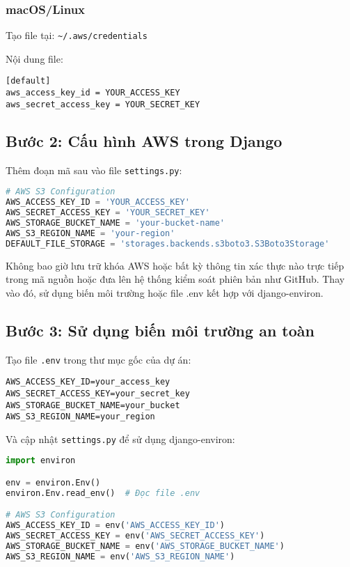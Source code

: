 \documentclass[12pt,a4paper]{article}
\begin{document}
\subsubsection{macOS/Linux}
Tạo file tại: \texttt{\~{}/.aws/credentials}

Nội dung file:

\begin{lstlisting}
[default]
aws_access_key_id = YOUR_ACCESS_KEY
aws_secret_access_key = YOUR_SECRET_KEY
\end{lstlisting}

\subsection{Bước 2: Cấu hình AWS trong Django}

Thêm đoạn mã sau vào file \texttt{settings.py}:

\begin{lstlisting}[language=python]
# AWS S3 Configuration
AWS_ACCESS_KEY_ID = 'YOUR_ACCESS_KEY'
AWS_SECRET_ACCESS_KEY = 'YOUR_SECRET_KEY'
AWS_STORAGE_BUCKET_NAME = 'your-bucket-name'
AWS_S3_REGION_NAME = 'your-region'
DEFAULT_FILE_STORAGE = 'storages.backends.s3boto3.S3Boto3Storage'
\end{lstlisting}

\begin{tcolorbox}[colback=red!5, colframe=red!50!black, title=Cảnh báo bảo mật]
Không bao giờ lưu trữ khóa AWS hoặc bất kỳ thông tin xác thực nào trực tiếp trong mã nguồn hoặc đưa lên hệ thống kiểm soát phiên bản như GitHub. Thay vào đó, sử dụng biến môi trường hoặc file .env kết hợp với django-environ.
\end{tcolorbox}

\subsection{Bước 3: Sử dụng biến môi trường an toàn}

Tạo file \texttt{.env} trong thư mục gốc của dự án:

\begin{lstlisting}
AWS_ACCESS_KEY_ID=your_access_key
AWS_SECRET_ACCESS_KEY=your_secret_key
AWS_STORAGE_BUCKET_NAME=your_bucket
AWS_S3_REGION_NAME=your_region
\end{lstlisting}

Và cập nhật \texttt{settings.py} để sử dụng django-environ:

\begin{lstlisting}[language=python]
import environ

env = environ.Env()
environ.Env.read_env()  # Đọc file .env

# AWS S3 Configuration
AWS_ACCESS_KEY_ID = env('AWS_ACCESS_KEY_ID')
AWS_SECRET_ACCESS_KEY = env('AWS_SECRET_ACCESS_KEY')
AWS_STORAGE_BUCKET_NAME = env('AWS_STORAGE_BUCKET_NAME')
AWS_S3_REGION_NAME = env('AWS_S3_REGION_NAME')
\end{lstlisting}
\end{document}
